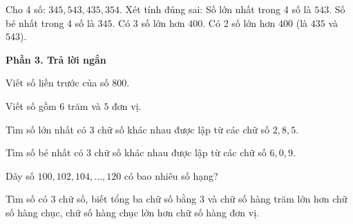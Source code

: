 \begin{ex} %
Cho 4 số: $345, 543, 435, 354$. Xét tính đúng sai:
\choiceTF
{\True Số lớn nhất trong 4 số là $543$.}
{\True Số bé nhất trong 4 số là $345$.}
{Có 3 số lớn hơn $400$.}
{\True Có 2 số lớn hơn $400$ (là $435$ và $543$).}
\end{ex}

\textbf{Phần 3. Trả lời ngắn}

\begin{ex} %
Viết số liền trước của số $800$.
\end{ex}

\begin{ex} %
Viết số gồm $6$ trăm và $5$ đơn vị.
\end{ex}

\begin{ex} %
Tìm số lớn nhất có 3 chữ số khác nhau được lập từ các chữ số $2, 8, 5$.
\end{ex}

\begin{ex} %
Tìm số bé nhất có 3 chữ số khác nhau được lập từ các chữ số $6, 0, 9$.
\end{ex}

\begin{ex} %
Dãy số $100, 102, 104, \dots, 120$ có bao nhiêu số hạng?
\end{ex}

\begin{ex} %
Tìm số có 3 chữ số, biết tổng ba chữ số bằng 3 và chữ số hàng trăm lớn hơn chữ số hàng chục, chữ số hàng chục lớn hơn chữ số hàng đơn vị.
\end{ex}
